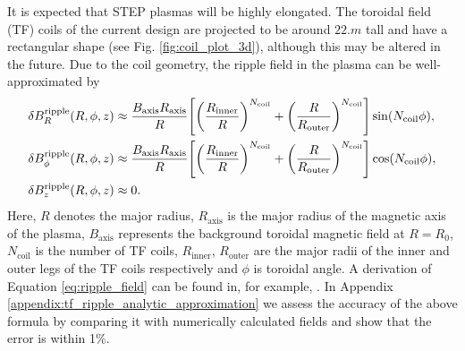 \documentclass[10pt, a4paper, twoside]{article}
\begin{document}
It is expected that STEP plasmas will be highly elongated. The toroidal field (TF) coils of the current design are projected to be around $\si{22.m}$ tall and have a rectangular shape (see Fig. \ref{fig:coil_plot_3d}), although this may be altered in the future. Due to the coil geometry, the ripple field in the plasma can be well-approximated by
\begin{equation}
    \label{eq:ripple_field}
    \begin{aligned}
        \delta B_R^{\text{ripple}}(R, \phi, z) &\approx \frac{B_\text{axis} R_\text{axis}}{R}\qty[\qty(\frac{R_\text{inner}}{R})^{N_\text{coil}} + \qty(\frac{R}{R_{\text{outer}}})^{N_\text{coil}}]\sin(N_{\text{coil}}\phi), \\
        \delta B_\phi^{\text{ripple}}(R, \phi, z) &\approx \frac{B_\text{axis} R_\text{axis}}{R}\qty[ \qty(\frac{R_\text{inner}}{R})^{N_\text{coil}} + \qty(\frac{R}{R_{\text{outer}}})^{N_\text{coil}}]\cos(N_{\text{coil}}\phi),\\
        \delta B_z^{\text{ripple}}(R, \phi, z) &\approx 0.
    \end{aligned}
\end{equation}
Here, $R$ denotes the major radius, $R_\text{axis}$ is the major radius of the magnetic axis of the plasma, $B_\text{axis}$ represents the background toroidal magnetic field at $R=R_0$, $N_{\text{coil}}$ is the number of TF coils, $R_\text{inner}$, $R_\text{outer}$ are the major radii of the inner and outer legs of the TF coils respectively and $\phi$ is toroidal angle. A derivation of Equation \eqref{eq:ripple_field} can be found in, for example, \cite{mcclements2005}. In Appendix \ref{appendix:tf_ripple_analytic_approximation} we assess the accuracy of the above formula by comparing it with numerically calculated fields and show that the error is within 1\%.
\end{document}
